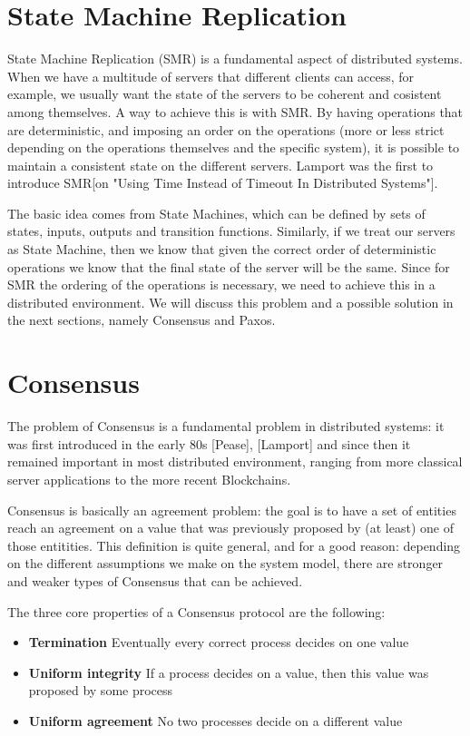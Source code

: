 \section{State Machine Replication}\label{sec:state-machine-replication}
State Machine Replication (SMR) is a fundamental aspect of distributed systems. When we have a multitude of servers that different clients can access, for example, we usually want the state of the servers to be coherent and cosistent among themselves. A way to achieve this is with SMR. By having operations that are deterministic, and imposing an order on the operations (more or less strict depending on the operations themselves and the specific system), it is possible to maintain a consistent state on the different servers. Lamport was the first to introduce SMR[on "Using Time Instead of Timeout In Distributed Systems"].

The basic idea comes from State Machines, which can be defined by sets of states, inputs, outputs and transition functions. Similarly, if we treat our servers as State Machine, then we know that given the correct order of deterministic operations we know that the final state of the server will be the same. Since for SMR the ordering of the operations is necessary, we need to achieve this in a distributed environment. We will discuss this problem and a possible solution in the next sections, namely Consensus and Paxos.

\section{Consensus}\label{sec:Consensus}

The problem of Consensus is a fundamental problem in distributed systems: it was first introduced in the early 80s [Pease], [Lamport] and since then it remained important in most distributed environment, ranging from more classical server applications to the more recent Blockchains.

Consensus is basically an agreement problem: the goal is to have a set of entities reach an agreement on a value that was previously proposed by (at least) one of those entitities. This definition is quite general, and for a good reason: depending on the different assumptions we make on the system model, there are stronger and weaker types of Consensus that can be achieved. 

The three core properties of a Consensus protocol are the following:

\begin{itemize}
    \item \textbf{Termination} Eventually every correct process decides on one value
    \item \textbf{Uniform integrity} If a process decides on a value, then this value was proposed by some process
    \item \textbf{Uniform agreement} No two processes decide on a different value
    \end{itemize}


